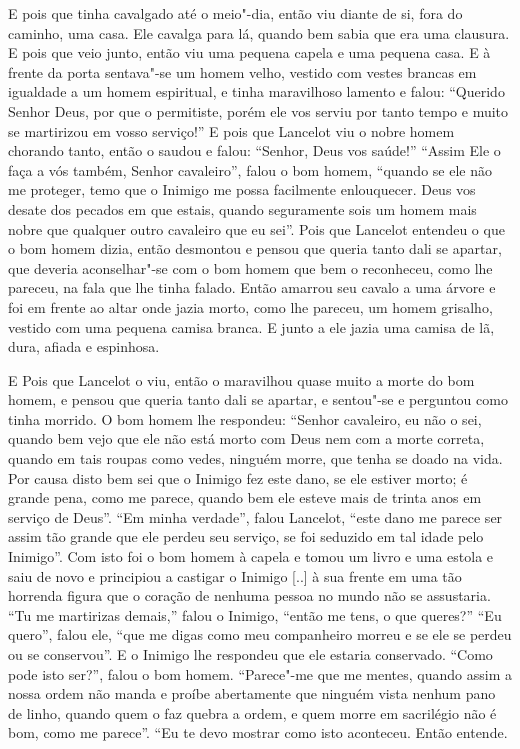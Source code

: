 E pois que tinha cavalgado até o meio"-dia, então viu diante de si, fora do
caminho, uma casa. Ele cavalga para lá, quando bem sabia que era uma clausura.
E pois que veio junto, então viu uma pequena capela e uma pequena casa. E à
frente da porta sentava"-se um homem velho, vestido com vestes brancas em
igualdade a um homem espiritual, e tinha maravilhoso lamento e falou: “Querido
Senhor Deus, por que o permitiste, porém ele vos serviu por tanto tempo e muito
se martirizou em vosso serviço!” E pois que Lancelot viu o nobre homem
chorando tanto, então o saudou e falou: “Senhor, Deus vos saúde!” “Assim Ele o
faça a vós também, Senhor cavaleiro”, falou o bom homem, “quando se ele não me
proteger, temo que o Inimigo me possa facilmente enlouquecer. Deus vos desate
dos pecados em que estais, quando seguramente sois um homem mais nobre que
qualquer outro cavaleiro que eu sei”. Pois que Lancelot entendeu o que o bom
homem dizia, então desmontou e pensou que queria tanto dali se apartar, que
deveria aconselhar"-se com o bom homem que bem o reconheceu, como lhe pareceu,
na fala que lhe tinha falado. Então amarrou seu cavalo a uma árvore e foi em
frente ao altar onde jazia morto, como lhe pareceu, um homem grisalho, vestido com
uma pequena camisa branca. E junto a ele jazia uma camisa de lã, dura, afiada e
espinhosa. 

E Pois que Lancelot o viu, então o maravilhou quase muito a morte do bom
homem, e pensou que queria tanto dali se apartar, e sentou"-se e perguntou como
tinha morrido. O bom homem lhe respondeu: “Senhor cavaleiro, eu não o sei,
quando bem vejo que ele não está morto com Deus nem com a morte correta, quando
em tais roupas como vedes, ninguém morre, que tenha se doado na vida. Por causa
disto bem sei que o Inimigo fez este dano, se ele estiver morto; é grande pena,
como me parece, quando bem ele esteve mais de trinta anos em serviço de Deus”.
“Em minha verdade”, falou Lancelot, “este dano me parece ser assim tão grande
que ele perdeu seu serviço, se foi seduzido em tal idade pelo Inimigo”. Com
isto foi o bom homem à capela e tomou um livro e uma estola e saiu de novo e
principiou a castigar o Inimigo [..] à sua frente em uma tão horrenda figura
que o coração de nenhuma pessoa no mundo não se assustaria. “Tu me martirizas
demais,” falou o Inimigo, “então me tens, o que queres?” “Eu quero”, falou
ele, “que me digas como meu companheiro morreu e se ele se perdeu ou se
conservou”. E o Inimigo lhe respondeu que ele estaria conservado. “Como pode
isto ser?”, falou o bom homem. “Parece"-me que me mentes, quando assim a nossa
ordem não manda e proíbe abertamente que ninguém vista nenhum pano de linho,
quando quem o faz quebra a ordem, e quem morre em sacrilégio não é bom, como me
parece”. “Eu te devo mostrar como isto aconteceu. Então entende.

